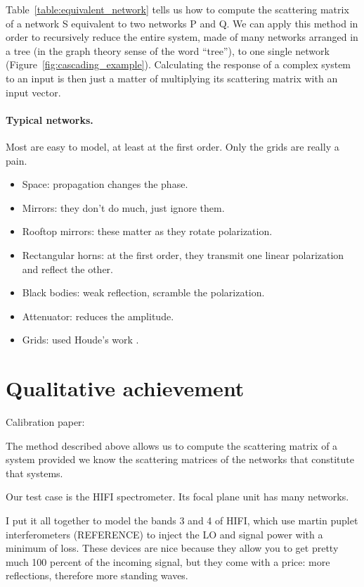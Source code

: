 \documentclass[a4paper,11pt]{article}
\begin{document}
Table~\ref{table:equivalent_network} tells us how to compute the scattering matrix of a network S equivalent to two networks P and Q.
We can apply this method in order to recursively reduce the entire system, made of many networks arranged in a tree (in the graph theory sense of the word ``tree''), to one single network (Figure~\ref{fig:cascading_example}).
Calculating the response of a complex system to an input is then just a matter of multiplying its scattering matrix with an input vector.

\paragraph{Typical networks.}
Most are easy to model, at least at the first order.
Only the grids are really a pain.
\begin{itemize}
    \item Space: propagation changes the phase.
    \item Mirrors: they don't do much, just ignore them.
    \item Rooftop mirrors: these matter as they rotate polarization.
    \item Rectangular horns: at the first order, they transmit one linear polarization and reflect the other.
    \item Black bodies: weak reflection, scramble the polarization.
    \item Attenuator: reduces the amplitude.
    \item Grids: used Houde's work \cite{houde_2001}.
\end{itemize}


\section{Qualitative achievement}
Calibration paper: \cite{AA_537_A17}

The method described above allows us to compute the scattering matrix of a system provided we know the scattering matrices of the networks that constitute that systems.

Our test case is the HIFI spectrometer.
Its focal plane unit has many networks.


I put it all together to model the bands 3 and 4 of HIFI, which use martin puplet  interferometers (REFERENCE) to inject the LO and signal power with a minimum of loss.
These devices are nice because they allow you to get pretty much 100 percent of the incoming signal, but they come with a price: more reflections, therefore more standing waves.
\end{document}
